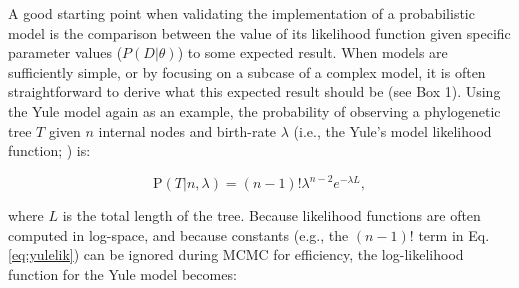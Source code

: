 \documentclass[oneside]{article}
\begin{document}



A good starting point when validating the implementation of a probabilistic
model is the comparison between the value of its likelihood function given
specific parameter values ($P(D|\theta)$) to some expected result.
When models are sufficiently simple, or by focusing
on a subcase of a complex model, it is often straightforward to derive
what this expected result should be (see Box 1).
Using the Yule model again as an example, the probability of observing
a phylogenetic tree $T$ given $n$ internal nodes and birth-rate
$\lambda$ (i.e., the Yule's model likelihood function;
\citealp{nee01}) is:

\begin{equation}
  \text{P}(T|n,\lambda) = (n-1)!\lambda^{n-2}e^{-\lambda L},
  \label{eq:yulelik}
\end{equation}

\noindent where $L$ is the total length of the tree.
Because likelihood functions are often computed in log-space, and
because constants (e.g., the $(n-1)!$ term in Eq. \ref{eq:yulelik}) can be
ignored during MCMC for efficiency, the log-likelihood function for the Yule model
becomes:
\end{document}
